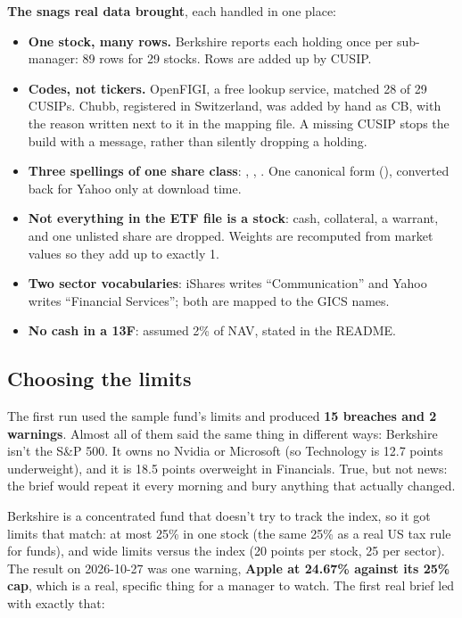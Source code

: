 \documentclass[11pt]{article}
\newcommand{\code}[1]{\texttt{\detokenize{#1}}}
\begin{document}
\textbf{The snags real data brought}, each handled in one place:

\begin{itemize}
  \item \textbf{One stock, many rows.} Berkshire reports each holding once per sub-manager: 89
        rows for 29 stocks. Rows are added up by CUSIP.
  \item \textbf{Codes, not tickers.} OpenFIGI, a free lookup service, matched 28 of 29 CUSIPs.
        Chubb, registered in Switzerland, was added by hand as CB, with the reason written
        next to it in the mapping file. A missing CUSIP stops the build with a message,
        rather than silently dropping a holding.
  \item \textbf{Three spellings of one share class}: \code{LEN/B}, \code{BRK-B}, \code{BRK B}.
        One canonical form (\code{BRK.B}), converted back for Yahoo only at download time.
  \item \textbf{Not everything in the ETF file is a stock}: cash, collateral, a warrant, and one
        unlisted share are dropped. Weights are recomputed from market values so they add up
        to exactly 1.
  \item \textbf{Two sector vocabularies}: iShares writes ``Communication'' and Yahoo writes
        ``Financial Services''; both are mapped to the GICS names.
  \item \textbf{No cash in a 13F}: assumed 2\% of NAV, stated in the README.
\end{itemize}

\subsection{Choosing the limits}

The first run used the sample fund's limits and produced \textbf{15 breaches and 2 warnings}.
Almost all of them said the same thing in different ways: Berkshire isn't the S\&P 500. It owns
no Nvidia or Microsoft (so Technology is 12.7 points underweight), and it is 18.5 points
overweight in Financials. True, but not news: the brief would repeat it every morning and bury
anything that actually changed.

Berkshire is a concentrated fund that doesn't try to track the index, so it got limits that
match: at most 25\% in one stock (the same 25\% as a real US tax rule for funds), and wide
limits versus the index (20 points per stock, 25 per sector). The result on 2026-10-27 was one
warning, \textbf{Apple at 24.67\% against its 25\% cap}, which is a real, specific thing for a
manager to watch. The first real brief led with exactly that:
\end{document}
